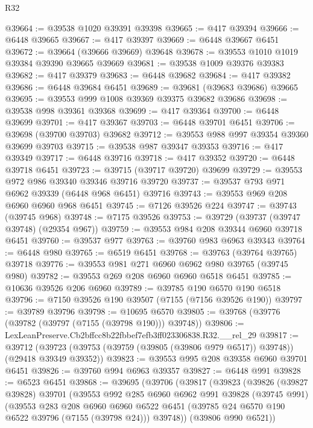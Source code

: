 \begin{lexlean}{R32}
\begin{coremodule}
@39664 := @39538 @1020 @39391 @39398
@39665 := @417 @39394
@39666 := @6448 @39665
@39667 := @417 @39397
@39669 := @6448 @39667 @6451
@39672 := @39664 (@39666 @39669) @39648
@39678 := @39553 @1010 @1019 @39384 @39390 @39665 @39669
@39681 := @39538 @1009 @39376 @39383
@39682 := @417 @39379
@39683 := @6448 @39682
@39684 := @417 @39382
@39686 := @6448 @39684 @6451
@39689 := @39681 (@39683 @39686) @39665
@39695 := @39553 @999 @1008 @39369 @39375 @39682 @39686
@39698 := @39538 @998 @39361 @39368
@39699 := @417 @39364
@39700 := @6448 @39699
@39701 := @417 @39367
@39703 := @6448 @39701 @6451
@39706 := @39698 (@39700 @39703) @39682
@39712 := @39553 @988 @997 @39354 @39360 @39699 @39703
@39715 := @39538 @987 @39347 @39353
@39716 := @417 @39349
@39717 := @6448 @39716
@39718 := @417 @39352
@39720 := @6448 @39718 @6451
@39723 := @39715 (@39717 @39720) @39699
@39729 := @39553 @972 @986 @39340 @39346 @39716 @39720
@39737 := @39537 @793 @971 @6962 @39339 (@6448 @968 @6451) @39716
@39743 := @39553 @969 @208 @6960 @6960 @968 @6451
@39745 := @7126 @39526 @224
@39747 := @39743 (@39745 @968)
@39748 := @7175 @39526
@39753 := @39729 (@39737 (@39747 @39748) (@29354 @967))
@39759 := @39553 @984 @208 @39344 @6960 @39718 @6451
@39760 := @39537 @977
@39763 := @39760 @983 @6963 @39343
@39764 := @6448 @980
@39765 := @6519 @6451
@39768 := @39763 (@39764 @39765) @39718
@39776 := @39553 @981 @271 @6960 @6962 @980 @39765 (@39745 @980)
@39782 := @39553 @269 @208 @6960 @6960 @6518 @6451
@39785 := @10636 @39526 @206 @6960
@39789 := @39785 @190 @6570 @190 @6518
@39796 := @7150 @39526 @190 @39507 (@7155 (@7156 @39526 @190))
@39797 := @39789 @39796
@39798 := @10695 @6570
@39805 := @39768 (@39776 (@39782 (@39797 (@7155 (@39798 @190))) @39748))
@39806 := LexLeanPreserve.Cb2bffcc8b22fbbef7efb3ff023306838.R32.__rel_29
@39817 := @39712
    (@39723 (@39753 (@39759 (@39805 (@39806 @979 @6517)) @39748)) (@29418 @39349 @39352))
@39823 := @39553 @995 @208 @39358 @6960 @39701 @6451
@39826 := @39760 @994 @6963 @39357
@39827 := @6448 @991
@39828 := @6523 @6451
@39868 := @39695
    (@39706
      (@39817
        (@39823
          (@39826
            (@39827 @39828)
            @39701
            (@39553
              @992
              @285
              @6960
              @6962
              @991
              @39828
              (@39745 @991)
              (@39553
                @283
                @208
                @6960
                @6960
                @6522
                @6451
                (@39785 @24 @6570 @190 @6522 @39796 (@7155 (@39798 @24)))
                @39748))
            (@39806 @990 @6521))

\end{coremodule}
\end{lexlean}
